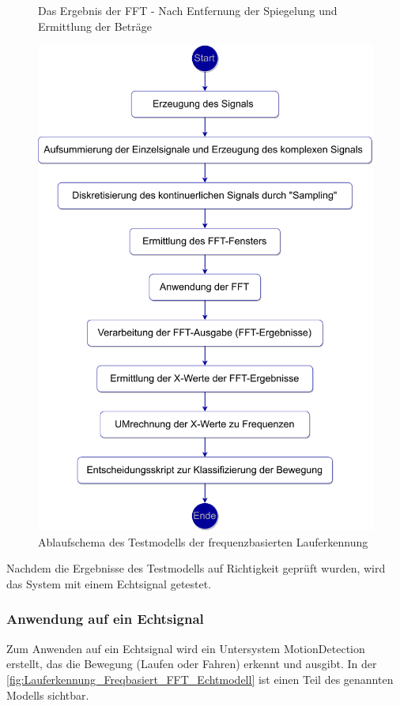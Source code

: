 \begin{figure}
	\centering 
	\caption{Das Ergebnis der FFT - Nach Entfernung der Spiegelung und Ermittlung der Beträge}
	\label{fig:FFT_Ergebnis_Skala_512}
\end{figure}

\begin{figure}
	\centering
	\includegraphics[width=0.7\linewidth]{Bilder/Frequenzermittlung_Ablaufschema_pdf.pdf}
	\caption{Ablaufschema des Testmodells der frequenzbasierten Lauferkennung}
	\label{fig:Lauferkennung_FFT_Ablaufschema_Testmodell}
\end{figure}

Nachdem die Ergebnisse des Testmodells auf Richtigkeit geprüft wurden, wird das System mit einem Echtsignal getestet. 

\subsubsection{Anwendung auf ein Echtsignal}

Zum Anwenden auf ein Echtsignal wird ein Untersystem \glqq MotionDetection\grqq{} erstellt, das die Bewegung (Laufen oder Fahren) erkennt und ausgibt.
In der \autoref{fig:Lauferkennung_Freqbasiert_FFT_Echtmodell} ist einen Teil des genannten Modells sichtbar. 

